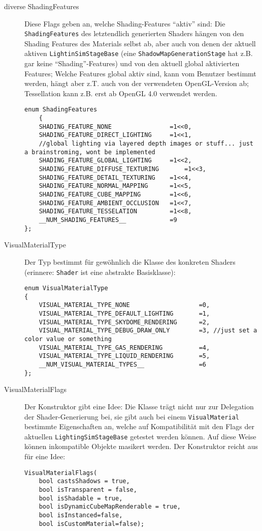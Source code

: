 \begin{description}
		
		
		\item[diverse ShadingFeatures] 
		Diese Flags geben an, welche Shading-Features "`aktiv"' sind: Die \lstinline|ShadingFeatures| des letztendlich
		generierten Shaders hängen von den Shading Features des Materials selbst ab, aber auch von denen der 
		aktuell aktiven \lstinline|LightinSimStageBase| (eine \lstinline|ShadowMapGenerationStage| hat z.B. gar keine
		"`Shading"'-Features) und von den aktuell global aktivierten Features; Welche Features global aktiv sind, kann
		vom Benutzer bestimmt werden, hängt aber z.T. auch von der verwendeten OpenGL-Version ab; Tessellation kann z.B. 
		erst ab OpenGL 4.0 verwendet werden.
		
		\begin{lstlisting}
enum ShadingFeatures
	{
	SHADING_FEATURE_NONE				=1<<0,
	SHADING_FEATURE_DIRECT_LIGHTING		=1<<1,
	//global lighting via layered depth images or stuff... just a brainstroming, wont be implemented
	SHADING_FEATURE_GLOBAL_LIGHTING		=1<<2,
	SHADING_FEATURE_DIFFUSE_TEXTURING		=1<<3,
	SHADING_FEATURE_DETAIL_TEXTURING	=1<<4,
	SHADING_FEATURE_NORMAL_MAPPING		=1<<5,
	SHADING_FEATURE_CUBE_MAPPING		=1<<6,
	SHADING_FEATURE_AMBIENT_OCCLUSION	=1<<7,
	SHADING_FEATURE_TESSELATION			=1<<8,
	__NUM_SHADING_FEATURES__			=9
};
	\end{lstlisting}
		
		
	\item[VisualMaterialType]
	Der Typ bestimmt für gewöhnlich die Klasse des konkreten Shaders (erinnere: \lstinline|Shader| ist eine abstrakte 
	Basisklasse):	
	\begin{lstlisting}
enum VisualMaterialType
{
	VISUAL_MATERIAL_TYPE_NONE					=0,
	VISUAL_MATERIAL_TYPE_DEFAULT_LIGHTING  		=1,
	VISUAL_MATERIAL_TYPE_SKYDOME_RENDERING		=2,
	VISUAL_MATERIAL_TYPE_DEBUG_DRAW_ONLY		=3,	//just set a color value or something
	VISUAL_MATERIAL_TYPE_GAS_RENDERING			=4,
	VISUAL_MATERIAL_TYPE_LIQUID_RENDERING		=5,
	__NUM_VISUAL_MATERIAL_TYPES__				=6
};
	\end{lstlisting}
	
	
	\item[VisualMaterialFlags]
	Der Konstruktor gibt eine Idee: Die Klasse trägt nicht nur zur Delegation der Shader-Generierung bei, sie
	gibt auch bei einem \lstinline|VisualMaterial| bestimmte Eigenschaften an,
	welche auf Kompatibilität mit den Flags der aktuellen \lstinline|LightingSimStageBase| getestet werden können.
	Auf diese Weise können inkompatible Objekte masikert werden.
	Der Konstruktor reicht aus für eine Idee:
	\begin{lstlisting}
VisualMaterialFlags(
	bool castsShadows = true,
	bool isTransparent = false,
	bool isShadable = true,
	bool isDynamicCubeMapRenderable = true,
	bool isInstanced=false,
	bool isCustomMaterial=false);
	\end{lstlisting}
		
	\end{description}


